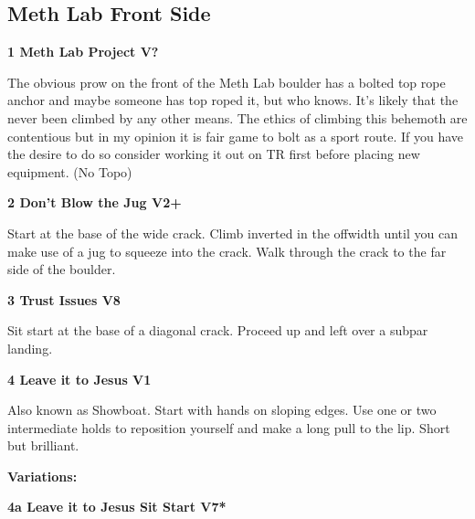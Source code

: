 \begin{multicols}{2}
	

		\subsection*{Meth Lab Front Side}\label{bf:Meth Lab Front Side}
			
			\label{rt:Meth Lab Project}
\colorbox{black!20}{
\parbox{0.95\linewidth}{
\textbf{
1 Meth Lab Project V?  \warn\warn\warn
}
}
}

			\begin{adjustwidth}{0.5cm}{}				
			The obvious prow on the front of the Meth Lab boulder has a bolted top rope anchor and maybe someone has top roped it, but who knows. It's likely that the never been climbed by any other means. The ethics of climbing this behemoth are contentious but in my opinion it is fair game to bolt as a sport route. If you have the desire to do so consider working it out on TR first before placing new equipment.
				\newline (No Topo) 
			\end{adjustwidth}
			\label{rt:Don't Blow the Jug}
\colorbox{green!20}{
\parbox{0.95\linewidth}{
\textbf{
2 Don't Blow the Jug V2+  \warn
}
}
}

			\begin{adjustwidth}{0.5cm}{}				
			Start at the base of the wide crack. Climb inverted in the offwidth until you can make use of a jug to squeeze into the crack. Walk through the crack to the far side of the boulder.
			\end{adjustwidth}
			\label{rt:Trust Issues}
\colorbox{Goldenrod!50}{
\parbox{0.95\linewidth}{
\textbf{
3 Trust Issues V8  \warn\warn
}
}
}

			\begin{adjustwidth}{0.5cm}{}				
			Sit start at the base of a diagonal crack. Proceed up and left over a subpar landing.
			\end{adjustwidth}
			\label{rt:Leave it to Jesus}
\colorbox{green!20}{
\parbox{0.95\linewidth}{
\textbf{
4 Leave it to Jesus V1  
}
}
}

			\begin{adjustwidth}{0.5cm}{}				
			Also known as Showboat. Start with hands on sloping edges. Use one or two intermediate holds to reposition yourself and make a long pull to the lip. Short but brilliant.
			\end{adjustwidth}
				\begin{adjustwidth}{0.5cm}{}				
				\textbf{Variations:} \newline
					\label{vr:Leave it to Jesus Sit Start}
\colorbox{Goldenrod!50}{
\parbox{0.95\linewidth}{
\textbf{
4a Leave it to Jesus Sit Start V7*  
}
}
}


\end{adjustwidth}
\end{multicols}
